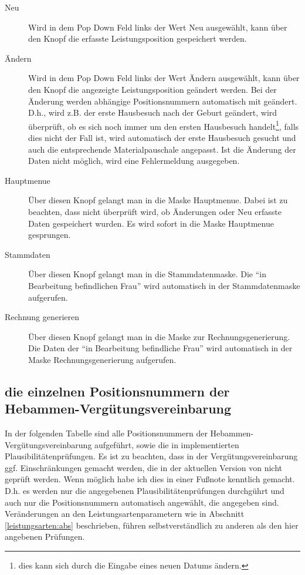 \begin{description}
\item[Neu]
Wird in dem Pop Down Feld links der Wert Neu ausgewählt, kann über
den Knopf  die erfasste Leistungsposition gespeichert
werden.
\item[Ändern]
Wird in dem Pop Down Feld links der Wert Ändern ausgewählt, kann
über den Knopf  die angezeigte Leistungsposition 
geändert werden. Bei der Änderung werden abhängige Positionsnummern
automatisch mit geändert. D.h., wird z.B. der erste Hausbesuch nach
der Geburt geändert, wird überprüft, ob es sich noch immer um den
ersten Hausbesuch handelt\footnote{dies kann sich durch die Eingabe 
eines neuen Datums 
ändern.}, falls dies nicht der Fall ist, wird automatisch der erste
Hausbesuch gesucht und auch die entsprechende Materialpauschale 
angepasst. Ist die Änderung der Daten nicht möglich, wird eine
Fehlermeldung ausgegeben.
\item[Hauptmenue] 
Über diesen Knopf gelangt man in die Maske Hauptmenue.
Dabei ist zu beachten, dass nicht überprüft wird, ob Änderungen oder Neu
erfasste Daten gespeichert wurden. Es wird sofort in die Maske Hauptmenue
gesprungen.
\item[Stammdaten]
Über diesen Knopf gelangt man in die Stammdatenmaske.
Die ``in Bearbeitung befindlichen Frau'' wird automatisch in der
Stammdatenmaske  aufgerufen.
\item[Rechnung generieren]
Über diesen Knopf gelangt man in die Maske zur Rechnungsgenerierung.
Die Daten der ``in Bearbeitung befindliche Frau'' wird automatisch in der 
Maske Rechnungsgenerierung aufgerufen.
\end{description}



\subsection{die einzelnen Positionsnummern der Hebammen-Vergütungsvereinbarung}
In der folgenden Tabelle sind alle Positionsnummern der 
Hebammen-Vergütungsvereinbarung
aufgeführt, sowie die in \tinyHeb\/ implementierten Plausibilitätenprüfungen.
Es ist zu beachten, dass in der Vergütungsvereinbarung ggf. Einschränkungen 
gemacht werden,
die in der aktuellen Version von \tinyHeb\/ nicht geprüft werden.
Wenn möglich habe ich dies in einer Fußnote kenntlich gemacht.
D.h. es werden nur die angegebenen Plausibilitätenprüfungen durchgührt und
auch nur die Positionsnummern automatisch angewählt, die angegeben sind.
Veränderungen an den Leistungsartenparametern wie in Abschnitt
\vref{leistungsarten:abs} beschrieben, führen selbstverständlich zu 
anderen als den hier angebenen Prüfungen.


